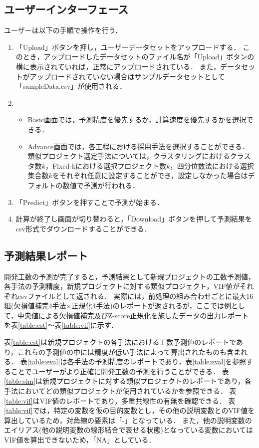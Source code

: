 \subsection{ユーザーインターフェース}
ユーザーは以下の手順で操作を行う．
\begin{enumerate}
  \item 「Upload」ボタンを押し，ユーザーデータセットをアップロードする．
  このとき，アップロードしたデータセットのファイル名が「Upload」ボタンの横に表示されていれば，正常にアップロードされている．
  また，データセットがアップロードされていない場合はサンプルデータセットとして「sampleData.csv」が使用される．
  \item \begin{itemize}
    \item Basic画面では，予測精度を優先するか，計算速度を優先するかを選択できる．
    \item Advance画面では，各工程における採用手法を選択することができる．類似プロジェクト選定手法については，クラスタリングにおけるクラスタ数$k$，Fixed-kにおける選択プロジェクト数$k$，四分位数法における選択集合数$k$をそれぞれ任意に設定することができ，設定しなかった場合はデフォルトの数値で予測が行われる．
    \end{itemize}
  \item 「Predict」ボタンを押すことで予測が始まる．
  \item 計算が終了し画面が切り替わると，「Download」ボタンを押して予測結果をcsv形式でダウンロードすることができる．

\end{enumerate}

\subsection{予測結果レポート}
開発工数の予測が完了すると，予測結果として新規プロジェクトの工数予測値，各手法の予測精度，新規プロジェクトに対する類似プロジェクト，VIF値がそれぞれcsvファイルとして返される．
実際には，前処理の組み合わせごとに最大16組(欠損値補完4手法$\times$正規化4手法)のレポートが返されるが，ここでは例として，中央値による欠損値補完及びZ-score正規化を施したデータの出力レポートを表\ref{table:est}～表\ref{table:vif}に示す．






表\ref{table:est}は新規プロジェクトの各手法における工数予測値のレポートであり，これらの予測値の中には精度が低い手法によって算出されたものも含まれる．
表\ref{table:eval}は各手法の予測精度のレポートであり，表\ref{table:eval}を参照することでユーザーがより正確に開発工数の予測を行うことができる．
表\ref{table:sim}は新規プロジェクトに対する類似プロジェクトのレポートであり，各手法においてどの類似プロジェクトが使用されているかを参照できる．
表\ref{table:vif}はVIF値のレポートであり，多重共線性の有無を確認できる．
表\ref{table:vif}では，特定の変数を仮の目的変数とし，その他の説明変数とのVIF値を算出しているため，対角線の要素は「-」となっている．
また，他の説明変数のエイリアス(他の説明変数の線形結合で表せる状態)となっている変数においてはVIF値を算出できないため，「NA」としている．

